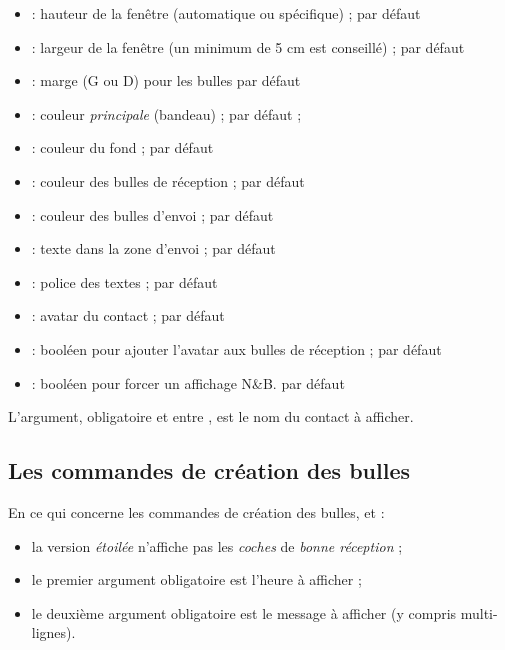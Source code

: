 \documentclass[french,11pt,a4paper]{article}
\begin{document}
\begin{itemize}
	\item {} : hauteur de la fenêtre (automatique ou spécifique) ;  par défaut
	\item {} : largeur de la fenêtre (un minimum de 5 cm est conseillé) ; \MontreCode{7cm} par défaut
	\item {} : marge (G ou D) pour les bulles \MontreCode{1.5cm} par défaut
	\item {} : couleur \textit{principale} (bandeau) ;  par défaut ;
	\item {} : couleur du fond ;  par défaut
	\item {} : couleur des bulles de réception ;  par défaut
	\item {} : couleur des bulles d'envoi ;  par défaut
	\item {} : texte dans la zone d'envoi ;  par défaut
	\item {} : police des textes ;  par défaut
	\item {} : avatar du contact ;  par défaut
	\item {} : booléen pour ajouter l'avatar aux bulles de réception ;  par défaut
	\item {} : booléen pour forcer un affichage N\&B.  par défaut
\end{itemize}

L'argument, obligatoire et entre , est le nom du contact à afficher.

\subsection{Les commandes de création des bulles}

En ce qui concerne les commandes de création des bulles,  et  :

\begin{itemize}
	\item la version \textit{étoilée} n'affiche pas les \textit{coches} de \textit{bonne réception} ;
	\item le premier argument obligatoire est l'heure à afficher ;
	\item le deuxième argument obligatoire est le message à afficher (y compris multi-lignes).
\end{itemize}
\end{document}
